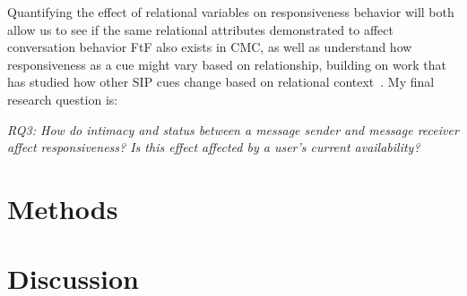 \documentclass[12pt]{nuthesis}	%
\begin{document}
Quantifying the effect of relational variables on responsiveness behavior will both allow us to see if the same relational attributes demonstrated to affect conversation behavior FtF also exists in CMC, as well as understand how responsiveness as a cue might vary based on relationship, building on work that has studied how other SIP cues change based on relational context~\citep[e.g.,][]{hancock2007expressing}. My final research question is:

\textit{RQ3: How do intimacy and status between a message sender and message receiver affect responsiveness? Is this effect affected by a user's current availability?}


\chapter{Methods}


\chapter{Discussion}

 \renewcommand\refname{\begin{centering}References\end{centering}}
 




\end{document}
